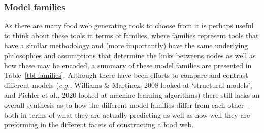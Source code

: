 \documentclass[
]{article}
\begin{document}
\subsubsection{Model families}\label{model-families}

As there are many food web generating tools to choose from it is perhaps
useful to think about these tools in terms of families, where families
represent tools that have a similar methodology and (more importantly)
have the same underlying philosophies and assumptions that determine the
links betweens nodes as well as how these may be encoded, a summary of
these model families are presented in Table~\ref{tbl-families}. Although
there have been efforts to compare and contrast different models
(\emph{e.g.,} Williams \& Martinez, 2008 looked at `structural models';
and Pichler et al., 2020 looked at machine learning algorithms) there
still lacks an overall synthesis as to how the different model families
differ from each other - both in terms of what they are actually
predicting as well as how well they are preforming in the different
facets of constructing a food web.
\end{document}
